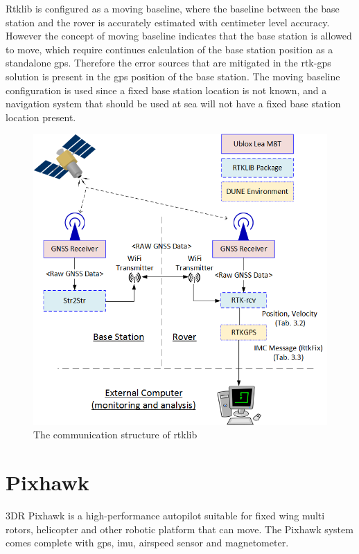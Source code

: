 Rtklib is configured as a moving baseline, where the baseline between the base station and the rover is accurately estimated with centimeter level accuracy. However the concept of moving baseline indicates that the base station is allowed to move, which require continues calculation of the base station position as a standalone \gls{gps}. Therefore the error sources that are mitigated in the \gls{rtk-gps} solution is present in the \gls{gps} position of the base station. The moving baseline configuration is used since a fixed base station location is not known, and a navigation system that should be used at sea will not have a fixed base station location present.
\begin{figure}[h]
	\centering
		\includegraphics[width=1\textwidth]{figs/RTKLIB.png}
		\caption{The communication structure of \gls{rtklib}}
		\label{figure:RTKLIB_STRUCTURE}
\end{figure}
\newpage

\section{Pixhawk}\label{ss:Pixhawk}
3DR Pixhawk is a high-performance autopilot suitable for fixed wing multi rotors, helicopter and other robotic platform that can move. The Pixhawk system comes complete with \gls{gps}, imu, airspeed sensor and magnetometer.
